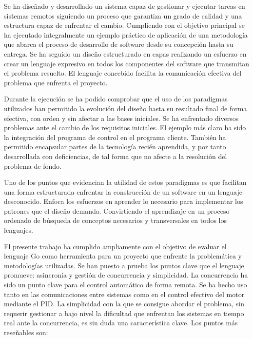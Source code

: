 Se ha diseñado y desarrollado un sistema capaz de gestionar y ejecutar tareas en sistemas remotos siguiendo un proceso que garantiza un grado de calidad y una estructura capaz de enfrentar el cambio.
Cumpliendo con el objetivo principal se ha ejecutado integralmente un ejemplo práctico de aplicación de una metodología que abarca el proceso de desarrollo de software desde su concepción hasta su entrega.
Se ha seguido un diseño estructurado en capas realizando un esfuerzo en crear un lenguaje expresivo en todos los componentes del software que transmitan el problema resuelto.
El lenguaje concebido facilita la comunicación efectiva del problema que enfrenta el proyecto.

Durante la ejecución se ha podido comprobar que el uso de los paradigmas utilizados han permitido la evolución del diseño hasta su resultado final de forma efectiva, con orden y sin afectar a las bases iniciales.
Se ha enfrentado diversos problemas ante el cambio de los requisitos iniciales.
El ejemplo más claro ha sido la integración del programa de control en el programa cliente.
También ha permitido encapsular partes de la tecnología recién aprendida, y por tanto desarrollada con deficiencias, de tal forma que no afecte a la resolución del problema de fondo.

Uno de los puntos que evidencian la utilidad de estos paradigmas es que facilitan una forma estructurada enfrentar la construcción de un software en un lenguaje desconocido.
Enfoca los esfuerzos en aprender lo necesario para implementar los patrones que el diseño demanda.
Convirtiendo el aprendizaje en un proceso ordenado de búsqueda de conceptos necesarios y transversales en todos los lenguajes.

El presente trabajo ha cumplido ampliamente con el objetivo de evaluar el lenguaje Go como herramienta para un proyecto que enfrente la problemática y metodologías utilizadas.
Se han puesto a prueba los puntos clave que el lenguaje promueve: asincronía y gestión de concurrencia y simplicidad.
La concurrencia ha sido un punto clave para el control automático de forma remota.
Se ha hecho uso tanto en las comunicaciones entre sistemas como en el control efectivo del motor mediante el PID\@.
La simplicidad con la que se consigue abordar el problema, sin requerir gestionar a bajo nivel la dificultad que enfrentan los sistemas en tiempo real ante la concurrencia, es sin duda una característica clave.
Los puntos más reseñables son:

